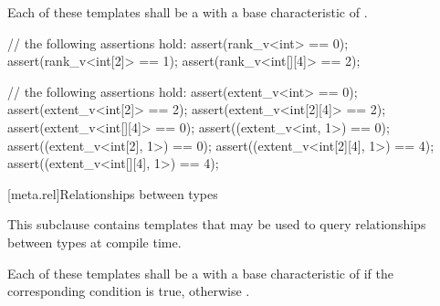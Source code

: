 \pnum
Each of these templates shall be a  with a
base characteristic of .

\pnum
\begin{example}
\begin{codeblock}
// the following assertions hold:
assert(rank_v<int> == 0);
assert(rank_v<int[2]> == 1);
assert(rank_v<int[][4]> == 2);
\end{codeblock}
\end{example}

\pnum
\begin{example}
\begin{codeblock}
// the following assertions hold:
assert(extent_v<int> == 0);
assert(extent_v<int[2]> == 2);
assert(extent_v<int[2][4]> == 2);
assert(extent_v<int[][4]> == 0);
assert((extent_v<int, 1>) == 0);
assert((extent_v<int[2], 1>) == 0);
assert((extent_v<int[2][4], 1>) == 4);
assert((extent_v<int[][4], 1>) == 4);
\end{codeblock}
\end{example}

[meta.rel]{Relationships between types}

\pnum
This subclause contains templates that may be used to query
relationships between types at compile time.

\pnum
Each of these templates shall be a
with a base characteristic of
 if the corresponding condition is true, otherwise
.

